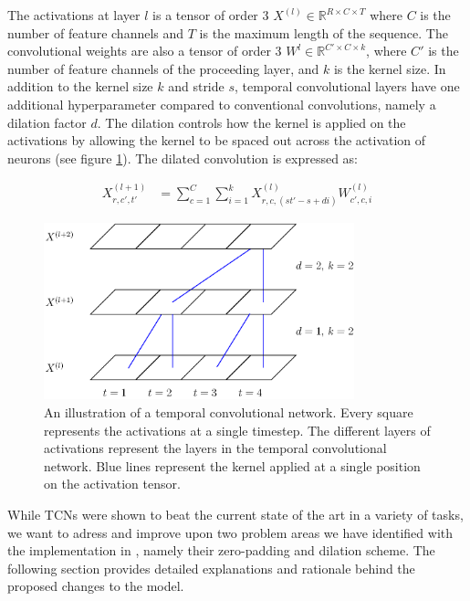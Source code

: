 \documentclass[a4paper, twoside]{article}
\begin{document}
The activations at layer $l$ is a tensor of order 3 $X^{(l)} \in \mathbb{R}^{R \times C \times T}$ where $C$ is the number of feature channels and $T$ is the maximum length of the sequence. The convolutional weights are also a tensor of order 3 $W^l \in \mathbb{R}^{C' \times C \times k}$, where $C'$ is the number of feature channels of the proceeding layer, and $k$ is the kernel size. In addition to the kernel size $k$ and stride $s$, temporal convolutional layers have one additional hyperparameter compared to conventional convolutions, namely a dilation factor $d$. The dilation controls how the kernel is applied on the activations by allowing the kernel to be spaced out across the activation of neurons (see figure \ref{figTCNdil}). The dilated convolution is expressed as:

\begin{equation}
\begin{split}
	X^{(l+1)}_{r, c', t'}	
		& = \sum^{C}_{c=1} \sum^{k}_{i=1} X^{(l)}_{r, c, (st'-s+di)}W^{(l)}_{c', c, i}
\end{split}
\end{equation}

\begin{figure}[h]
\begin{center}
    \includegraphics[width=9cm]{figTCNdil.eps}\caption{An illustration of a temporal convolutional network. Every square represents the activations at a single timestep. The different layers of activations represent the layers in the temporal convolutional network. Blue lines represent the kernel applied at a single position on the activation tensor.} 
    
    \label{figTCNdil}
\end{center}
\end{figure}

While TCNs \cite{tcn} were shown to beat the current state of the art in a variety of tasks, we want to adress and improve upon two problem areas we have identified with the implementation in \cite{tcn}, namely their zero-padding and dilation scheme. The following section provides detailed explanations and rationale behind the proposed changes to the model.
\end{document}
